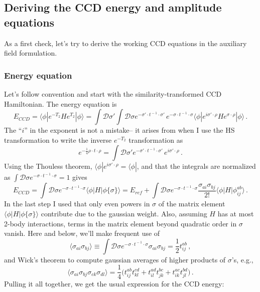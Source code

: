 \documentclass[12pt]{article}
\begin{document}
\subsection{Deriving the CCD energy and amplitude equations}
As a first check, let's try to derive the working CCD equations in the auxiliary field formulation. 

\subsubsection{Energy equation}
Let's follow convention and start with the similarity-transformed CCD Hamiltonian.  The energy equation is
\begin{equation}
E_{CCD} = \langle\phi |e^{-T_2}He^{T_2}|\phi\rangle = \int \mathcal{D}\sigma'\int \mathcal{D}\sigma e^{-\sigma'\cdot t^{\!-1}\!\cdot\sigma'}\,e^{-\sigma\cdot t^{\!-1}\!\cdot\sigma}\langle\phi|e^{i\sigma'\cdot\rho}He^{\sigma\cdot\rho}|\phi\rangle\,.
\end{equation}
The ``$i$'' in the exponent is not a mistake-- it arises from when I use the HS transformation to write the inverse $e^{-T_2}$ transformation as
\begin{equation}
e^{-\frac{1}{4}\rho\cdot t \cdot \rho}=\int \mathcal{D}\sigma' e^{-\sigma'\cdot t^{\!-1}\!\cdot\sigma'}\,e^{i\sigma'\cdot\rho}\,.
\end{equation}
Using the Thouless theorem, $\langle\phi|e^{i\sigma'\cdot\rho}=\langle\phi|$, and that the integrals are normalized as $\int\mathcal{D}\sigma e^{-\sigma\cdot t^{\!-1}\!\cdot\sigma} = 1$ gives
\begin{equation}
E_{CCD} = \int \mathcal{D}\sigma e^{-\sigma\cdot t^{\!-1}\!\cdot\sigma}\langle\phi|H|\phi\{\sigma\}\rangle = E_{ref} + \int \mathcal{D}\sigma e^{-\sigma\cdot t^{\!-1}\!\cdot\sigma}\frac{\sigma_{ai}\sigma_{bj}}{2!}\langle\phi|H|\phi^{ab}_{ij}\rangle\,.
\end{equation}
In the last step I used that only even powers in $\sigma$ of the matrix element $\langle\phi|H|\phi\{\sigma\}\rangle$ contribute due to the gaussian weight.  Also, assuming $H$ has at most 2-body interactions, terms in the matrix element beyond quadratic order in $\sigma$ vanish.  Here and below, we'll make frequent use of
\begin{equation}
\langle \sigma_{ai}\sigma_{bj}\rangle \equiv \int \mathcal{D}\sigma e^{-\sigma\cdot t^{\!-1}\!\cdot\sigma}\sigma_{ai}\sigma_{bj} = \frac{1}{2}t^{ab}_{ij}\,,
\end{equation}
and Wick's theorem to compute gaussian averages of higher products of $\sigma$'s, e.g., 
\begin{equation}
\langle\sigma_{ai}\sigma_{bj}\sigma_{ck}\sigma_{dl}\rangle = \frac{1}{4}\bigl(t^{ab}_{ij}t^{cd}_{kl}+ t^{ad}_{il}t^{bc}_{jk} + t^{ac}_{ik}t^{bd}_{jl}\bigr)\,.
\end{equation}
Pulling it all together, we get the usual expression for the CCD energy:
\end{document}
